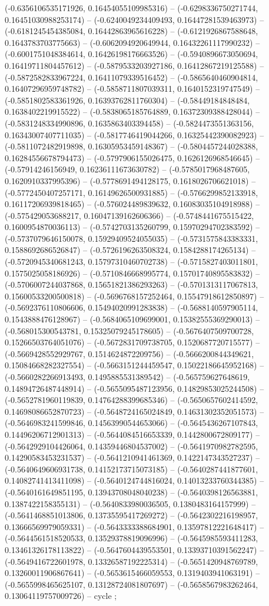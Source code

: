 (-0.6356106535171926, 0.16454055109985316) -- (-0.6298336750271744, 0.16451030988253174) -- (-0.6240049234409493, 0.16447281539463973) -- (-0.6181245454385084, 0.16442863965616228) -- (-0.6121926867588648, 0.1643783703775663) -- (-0.6062094920649944, 0.16432261117990232) -- (-0.6001751048384614, 0.16426198176663526) -- (-0.5940896673050694, 0.16419711804457612) -- (-0.5879533203927186, 0.16412867219125588) -- (-0.5872582833967224, 0.16411079339516452) -- (-0.5865640460904814, 0.16407296959748782) -- (-0.5858711807039311, 0.1640152319747549) -- (-0.5851802583361926, 0.16393762811760304) -- (-0.58449184848484, 0.1638402219915522) -- (-0.5838065185764889, 0.16372309388428044) -- (-0.5831248334990896, 0.1635863403394458) -- (-0.5824473551363156, 0.16343007407711035) -- (-0.5817746419044266, 0.16325442390082923) -- (-0.5811072482919898, 0.16305953459148367) -- (-0.5804457244028388, 0.16284556678794473) -- (-0.5797906155026475, 0.1626126968546645) -- (-0.57914246156949, 0.16236111673630782) -- (-0.5785017968487605, 0.1620910337995396) -- (-0.5778691494128175, 0.1618026706621018) -- (-0.5772450407257171, 0.16149626500931885) -- (-0.5766299852133918, 0.16117206939818465) -- (-0.576024489839632, 0.16083035104918988) -- (-0.575429053688217, 0.16047139162606366) -- (-0.5748441675515422, 0.1600954870036113) -- (-0.5742703135260799, 0.15970294702383592) -- (-0.5737079646150078, 0.15929409524055035) -- (-0.5731575843383331, 0.1588692686526847) -- (-0.5726196263508324, 0.1584288174265134) -- (-0.5720945340681243, 0.15797310460702738) -- (-0.5715827403011801, 0.1575025058186926) -- (-0.5710846668995774, 0.15701740895583832) -- (-0.5706007244037868, 0.15651821386293263) -- (-0.5701313117067813, 0.15600533200500818) -- (-0.5696768157252464, 0.15547918612850897) -- (-0.5692376110806606, 0.15494020991283838) -- (-0.5688140597905114, 0.1543888476128967) -- (-0.5684065109699001, 0.15382555369290013) -- (-0.568015300543781, 0.15325079245178605) -- (-0.5676407509700728, 0.15266503764051076) -- (-0.5672831709738705, 0.1520687720715577) -- (-0.5669428552929767, 0.1514624872209756) -- (-0.5666200844349621, 0.15084668282327554) -- (-0.5663151244459547, 0.15022186645952168) -- (-0.5660282266913493, 0.1495885531389542) -- (-0.565759627648619, 0.14894726487448914) -- (-0.5655095487123956, 0.14829853025244508) -- (-0.5652781960119839, 0.14764288399685346) -- (-0.5650657602414592, 0.14698086652870723) -- (-0.5648724165024849, 0.14631302352051573) -- (-0.5646983241599846, 0.14563990544653066) -- (-0.5645436267107843, 0.14496206712901313) -- (-0.5644084516653339, 0.1442800672809177) -- (-0.5642929104426064, 0.14359446804537002) -- (-0.5641970982782595, 0.14290583453231537) -- (-0.5641210941461369, 0.1422147343527237) -- (-0.5640649606931738, 0.14152173715073185) -- (-0.5640287441877601, 0.14082741413411098) -- (-0.5640124744816024, 0.14013233760344385) -- (-0.5640161649851195, 0.13943708048040238) -- (-0.5640398126563881, 0.1387422158355131) -- (-0.5640833980036505, 0.1380483164157999) -- (-0.5641468851013806, 0.13735595417269272) -- (-0.5642302216198957, 0.13666569979059331) -- (-0.5643333388684901, 0.13597812221648417) -- (-0.5644561518520533, 0.13529378819096996) -- (-0.5645985593411283, 0.13461326178113822) -- (-0.5647604439553501, 0.13393710391562247) -- (-0.5649416722601978, 0.13326587192225314) -- (-0.5651420948769789, 0.13260011906867641) -- (-0.5653615466059553, 0.1319403941063191) -- (-0.5655998465625107, 0.13128724081807697) -- (-0.5658567983262464, 0.13064119757009726) -- cycle
;